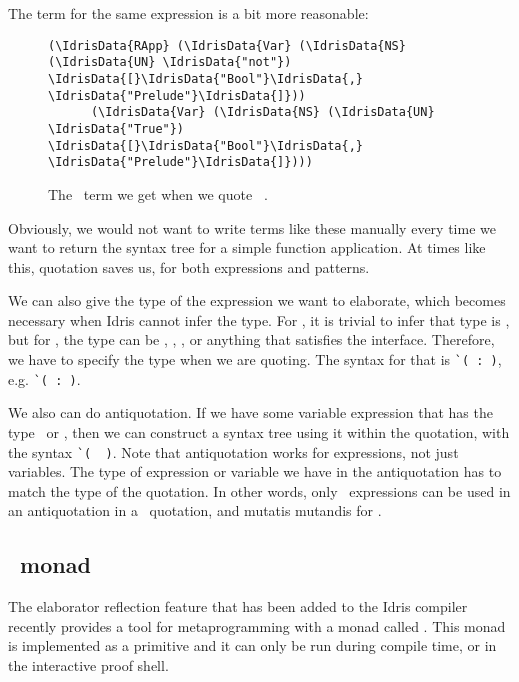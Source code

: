 The  term for the same expression is a bit more reasonable:
\begin{figure}[ht]
  \caption{The \Raw\ term we get when we quote \texttt{ }.}
\begin{Verbatim}[framesep=2mm, label=\footnotesize{\normalfont{Idris}}, labelposition=topline]
(\IdrisData{RApp} (\IdrisData{Var} (\IdrisData{NS} (\IdrisData{UN} \IdrisData{"not"}) \IdrisData{[}\IdrisData{"Bool"}\IdrisData{,} \IdrisData{"Prelude"}\IdrisData{]}))
      (\IdrisData{Var} (\IdrisData{NS} (\IdrisData{UN} \IdrisData{"True"}) \IdrisData{[}\IdrisData{"Bool"}\IdrisData{,} \IdrisData{"Prelude"}\IdrisData{]})))
\end{Verbatim}
\end{figure}

Obviously, we would not want to write terms like these manually every time we want to return
the syntax tree for a simple function application.
At times like this, quotation saves us, for both expressions and patterns.

We can also give the type of the expression we want to elaborate, which becomes
necessary when Idris cannot infer the type. For , it is trivial to
infer that type is , but for , the type can be ,
, , or anything that satisfies the  interface.
Therefore, we have to specify the type when we are quoting. The
syntax for that is \texttt{\`{}( : )},
e.g. \texttt{\`{}( : )}.

We also can do antiquotation. If we have some variable expression  that has the
type \TT\ or , then we can construct a syntax tree using it within the
quotation, with the syntax \texttt{\`{}( ~)}.
Note that antiquotation works for expressions, not just variables. The type of
expression or variable we have in the antiquotation has to match the type of
the quotation. In other words, only \TT\ expressions can be used in an
antiquotation in a \TT\ quotation, and mutatis mutandis for .

\subsection{\protect\Elab\ monad}

The elaborator reflection\cite{elabref} feature that has been added to the
Idris compiler recently provides a tool for metaprogramming with a monad called
\Elab.  This monad is implemented as a primitive and it can only be run during
compile time, or in the interactive proof shell.

